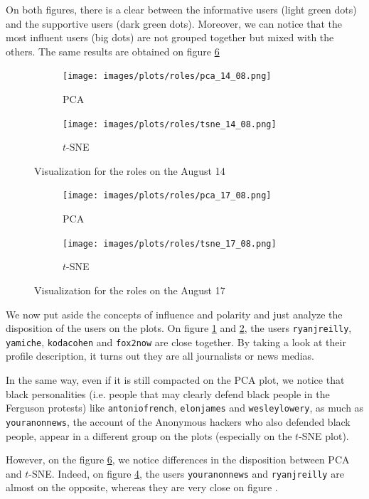 \documentclass[a4paper,twoside,12pt,openright]{report}
\begin{document}
On both figures, there is a clear between the informative users (light green dots) and the supportive users (dark green dots). Moreover, we can notice that the most influent users (big dots) are not grouped together but mixed with the others. The same results are obtained on figure \ref{RolePlot17}
\begin{figure}[H]
\begin{subfigure}[t]{0.5\textwidth}
\centering
\texttt{[image: images/plots/roles/pca\_14\_08.png]}
\caption{PCA}
\label{Role14PCA}
\end{subfigure}
\hfill
\begin{subfigure}[t]{0.5\textwidth}
\centering
\texttt{[image: images/plots/roles/tsne\_14\_08.png]}
\caption{$t$-SNE}
\label{Role14TSNE}
\end{subfigure}
\caption{Visualization for the roles on the August 14}
\label{RolePlot14}
\end{figure}

\begin{figure}[H]
\begin{subfigure}[t]{0.5\textwidth}
\centering
\texttt{[image: images/plots/roles/pca\_17\_08.png]}
\caption{PCA}
\label{Role17PCA}
\end{subfigure}
\hfill
\begin{subfigure}[t]{0.5\textwidth}
\centering
\texttt{[image: images/plots/roles/tsne\_17\_08.png]}
\caption{$t$-SNE}
\label{Role17TSNE}
\end{subfigure}
\caption{Visualization for the roles on the August 17}
\label{RolePlot17}
\end{figure}

We now put aside the concepts of influence and polarity and just analyze the disposition of the users on the plots. On figure \ref{Role14PCA} and \ref{Role14TSNE}, the users \texttt{ryanjreilly}, \texttt{yamiche}, \texttt{kodacohen} and \texttt{fox2now} are close together. By taking a look at their profile description, it turns out they are all journalists or news medias. 

In the same way, even if it is still compacted on the PCA plot, we notice that black personalities (i.e. people that may clearly defend black people in the Ferguson protests) like \texttt{antoniofrench}, \texttt{elonjames} and \texttt{wesleylowery}, as much as \texttt{youranonnews}, the account of the Anonymous hackers who also defended black people, appear in a different group on the plots (especially on the $t$-SNE plot).


However, on the figure \ref{RolePlot17}, we notice differences in the disposition between PCA and $t$-SNE. Indeed, on figure \ref{Role17PCA}, the users \texttt{youranonnews} and \texttt{ryanjreilly} are almost on the opposite, whereas they are very close on figure \label{Role17TSNE}.
\end{document}
